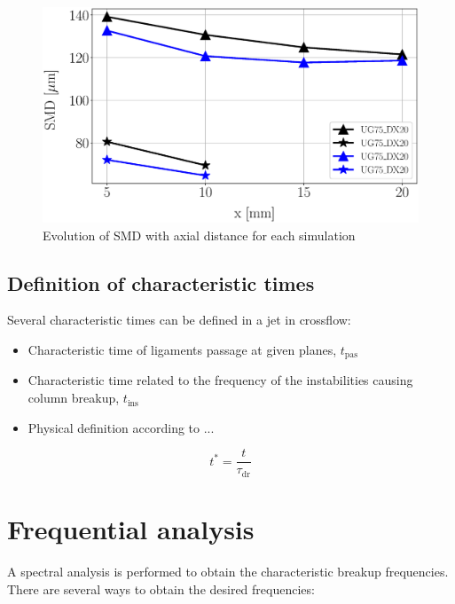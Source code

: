 \begin{figure}[ht]
\centering
   \includegraphics[scale=0.30]{./part2_developments/figures_ch5_resolved_JICF/SMD_values.eps}
   \caption{Evolution of SMD with axial distance for each simulation}
   \label{}
\end{figure}

\subsection{Definition of characteristic times}

Several characteristic times can be defined in a jet in crossflow:

\begin{itemize}

	\item Characteristic time of ligaments passage at given planes, $t_\mathrm{pas}$
	
	\item Characteristic time related to the frequency of the instabilities causing column breakup, $t_\mathrm{ins}$
	
	\item Physical definition according to ...

\end{itemize}


\begin{equation}
t^* = \frac{t}{\tau_\mathrm{dr}}
\end{equation}

\section{Frequential analysis}

A spectral analysis is performed to obtain the characteristic breakup frequencies. There are several ways to obtain the desired frequencies:


